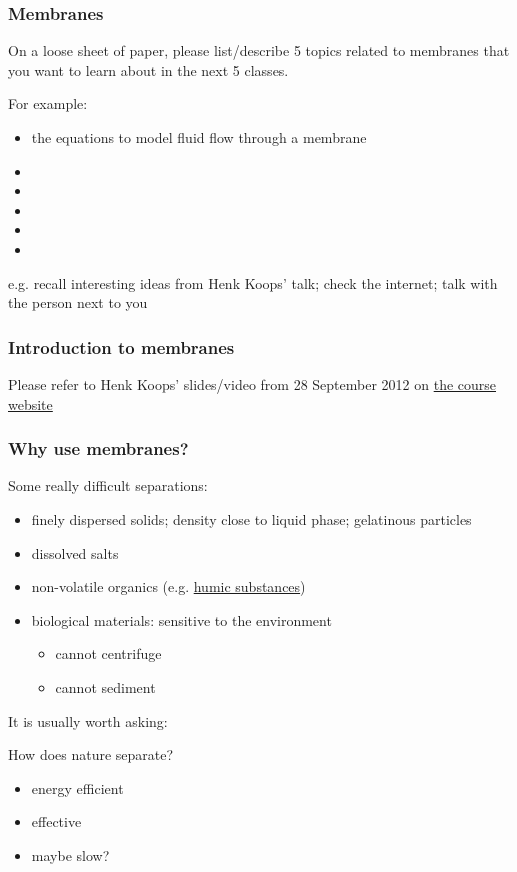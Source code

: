 
\begin{frame}\frametitle{Membranes}
	On a loose sheet of paper, please list/describe 5 topics related to membranes that you want to learn about in the next 5 classes.
	
	\vspace{12pt}
	For example:
	\begin{itemize}
		\item	the equations to model fluid flow through a membrane
		\item	
		\item	
		\item	
		\item	
		\item	
	\end{itemize}
	
	\vspace{12pt}
	e.g. recall interesting ideas from Henk Koops' talk; check the internet; talk with the person next to you
\end{frame}

\begin{frame}\frametitle{Introduction to membranes}
	Please refer to Henk Koops' slides/video from 28 September 2012 on \href{http://learnche.mcmaster.ca/4M3/Membranes,_dialysis,_reverse_osmosis,_filters_and_bioseparations_-_2012}{the course website}
\end{frame}

\begin{frame}\frametitle{Why use membranes?}
	Some really difficult separations:
	\begin{itemize}
		\item	finely dispersed solids; density close to liquid phase; gelatinous particles
		\item	dissolved salts
		\item	non-volatile organics (e.g. \href{http://en.wikipedia.org/wiki/Humic_acid}{humic substances})
		\item	biological materials: sensitive to the environment
			\begin{itemize}
				\item	cannot centrifuge 
				\item	cannot sediment
			\end{itemize}
	\end{itemize}
	
	\vspace{12pt}
	\begin{exampleblock}{It is usually worth asking:}
		\begin{center}
			How does nature separate?
		\end{center}
		\scriptsize
		\begin{itemize}
			\item	energy efficient
			\item	effective
			\item	maybe slow?
		\end{itemize}
	\end{exampleblock}		
\end{frame}

